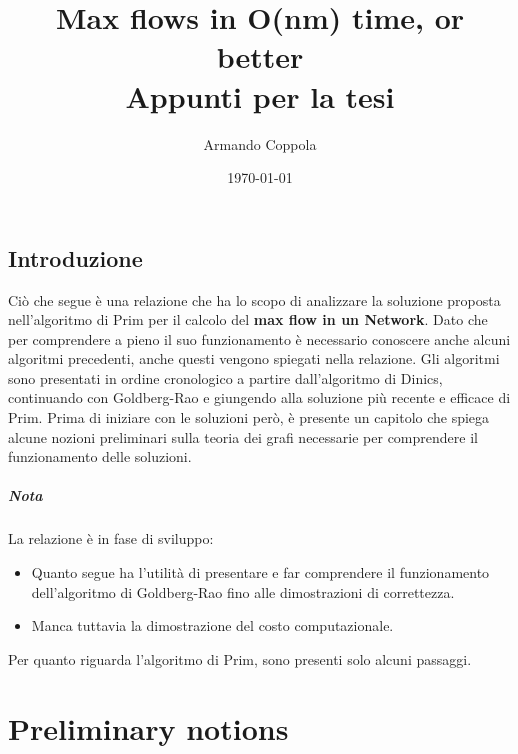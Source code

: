 \documentclass[a4paper, 11pt]{report}
\title{Max flows in O(nm) time, or better\\
\large Appunti per la tesi}
\author{Armando Coppola}
\date{\today}
\begin{document}
\maketitle
\newpage
\tableofcontents
\newpage
\section*{Introduzione}
Ciò che segue è una relazione che ha lo scopo di analizzare la soluzione proposta nell'algoritmo di Prim per il calcolo del \textbf{max flow in un Network}.
Dato che per comprendere a pieno il suo funzionamento è necessario conoscere anche alcuni algoritmi precedenti, anche questi vengono spiegati nella relazione. 
Gli algoritmi sono presentati in ordine cronologico a partire dall'algoritmo di Dinics, continuando con Goldberg-Rao e giungendo alla soluzione più recente e efficace di Prim.
Prima di iniziare con le soluzioni però, è presente un capitolo che spiega alcune nozioni preliminari sulla teoria dei grafi necessarie per comprendere il funzionamento delle soluzioni.

\paragraph*{Nota}
La relazione è in fase di sviluppo:
\begin{itemize}
    \item Quanto segue ha l'utilità di presentare e far comprendere il funzionamento dell'algoritmo di Goldberg-Rao fino alle dimostrazioni di correttezza.
    \item Manca tuttavia la dimostrazione del costo computazionale.
\end{itemize}
Per quanto riguarda l'algoritmo di Prim, sono presenti solo alcuni passaggi.

\chapter{Preliminary notions}
\end{document}
